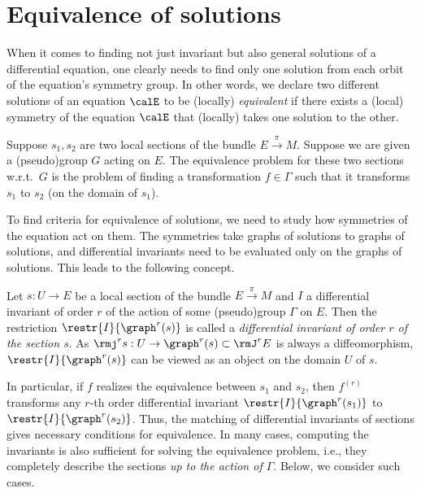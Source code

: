 \section{Equivalence of solutions}


When it comes to finding not just invariant but also general solutions of a differential equation, one clearly needs to find only one solution from each orbit of the equation's symmetry group. In other words, we declare two different solutions of an equation $\calE$ to be (locally) \emph{equivalent} if there exists a (local) symmetry of the equation $\calE$ that (locally) takes one solution to the other.

\begin{defn}
    Suppose $s_1,s_2$ are two local sections of the bundle $E\overset{\pi}{\to}M$. Suppose we are given a (pseudo)group $G$ acting on $E$. The equivalence problem for these two sections w.r.t.\ $G$ is the problem of finding a transformation $f\in\Gamma$ such that it transforms $s_1$ to $s_2$ (on the domain of $s_1$).
\end{defn}

To find criteria for equivalence of solutions, we need to study how symmetries of the equation act on them. The symmetries take graphs of solutions to graphs of solutions, and differential invariants need to be evaluated only on the graphs of solutions. This leads to the following concept.

\begin{defn}
    Let $s:U\to E$ be a local section of the bundle $E\overset{\pi}{\to}M$ and $I$ a differential invariant of order $r$ of the action of some (pseudo)group $\Gamma$ on $E$. Then the restriction $\restr{I}{\graph^{r}(s)}$ is called a \emph{differential invariant of order $r$ of the section $s$}. As $\rmj^r s:U\to \graph^{r}(s)\subset\rmJ^rE$ is always a diffeomorphism, $\restr{I}{\graph^{r}(s)}$ can be viewed as an object on the domain $U$ of $s$.
\end{defn}


In particular, if $f$ realizes the equivalence between $s_1$ and $s_2$, then $f^{(r)}$ transforms any $r$-th order differential invariant $\restr{I}{\graph^{r}(s_1)}$ to $\restr{I}{\graph^{r}(s_2)}$. Thus, the matching of differential invariants of sections gives necessary conditions for equivalence. In many cases, computing the invariants is also sufficient for solving the equivalence problem, i.e., they completely describe the sections \emph{up to the action of $\Gamma$}. Below, we consider such cases.

